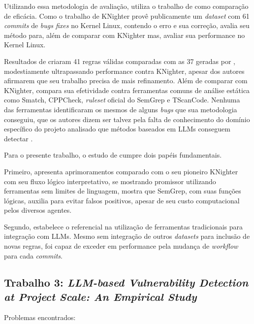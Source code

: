\documentclass[
    12pt,                %
    openright,           %
    oneside,             %
    a4paper,             %
    english,             %
    brazil               %
]{abntex2}
\begin{document}
\begin{itemize}
\par
Utilizando essa metodologia de avaliação,  utiliza o trabalho de  como comparação de eficácia.
Como o trabalho de KNighter provê publicamente um \textit{dataset} com 61 \textit{commits} de \textit{bugs fixes} no Kernel Linux, contendo o erro e sua correção,  avalia seu método para, além de comparar com KNighter mas, avaliar sua performance no Kernel Linux.
\par
Resultados de  criaram 41 regras válidas comparadas com as 37 geradas por , modestiamente ultrapassando performance contra KNighter, apesar dos autores afirmarem que seu trabalho precisa de mais refinamento. 
Além de comparar com KNighter,  compara sua efetividade contra ferramentas comuns de análise estática como Smatch, CPPCheck, \textit{ruleset} oficial do SemGrep e TScanCode.
Nenhuma das ferramentas identificaram os mesmos de alguns \textit{bugs} que sua metodologia conseguiu, que os autores dizem ser talvez pela falta de conhecimento do domínio específico do projeto analisado que métodos baseados em LLMs conseguem detectar \cite{hou2025generation}. 
\par
Para o presente trabalho, o estudo de  cumpre dois papéis fundamentais.
\par
Primeiro, apresenta aprimoramentos comparado com o seu pioneiro KNighter com seu fluxo lógico interpretativo, se mostrando promissor utilizando ferramentas sem limites de linguagem,  mostra que SemGrep, com suas funções lógicas, auxilia para evitar falsos positivos, apesar de seu custo computacional pelos diversos agentes.
\par
Segundo, estabelece o referencial na utilização de ferramentas tradicionais para integração com LLMs.
Mesmo sem integração de outros \textit{datasets} para inclusão de novas regras,  foi capaz de exceder em performance pela mudança de \textit{workflow} para cada \textit{commits}.


\subsection{Trabalho 3: \textit{LLM-based Vulnerability Detection at Project Scale: An Empirical Study} \cite{li2026llmbased}}

\par
Problemas encontrados:


\end{itemize}
\end{document}
